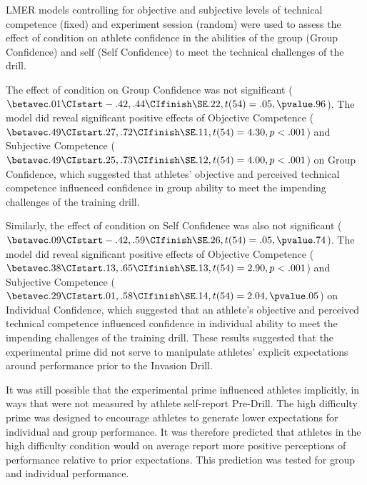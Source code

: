 LMER models controlling for objective and subjective levels of technical competence (fixed) and experiment session (random) were used to assess the effect of condition on athlete confidence in the abilities of the group (Group Confidence) and self (Self Confidence) to meet the technical challenges of the drill.

The effect of condition on Group Confidence was not significant ($\betavec .01 \CIstart -.42, .44 \CIfinish \SE .22, t(54)= .05, \pvalue .96$). The model did reveal significant positive effects of Objective Competence ($\betavec .49 \CIstart .27, .72 \CIfinish \SE .11, t(54)= 4.30, p <.001$) and Subjective Competence ($\betavec .49 \CIstart .25, .73 \CIfinish \SE .12, t(54)= 4.00, p < .001$) on Group Confidence, which suggested that athletes' objective and perceived technical competence influenced confidence in group ability to meet the impending challenges of the training drill.

Similarly, the effect of condition on Self Confidence was also not significant ($\betavec .09 \CIstart -.42, .59 \CIfinish \SE .26, t(54)= .05, \pvalue .74$). The model did reveal significant positive effects of Objective Competence ($\betavec .38 \CIstart .13, .65 \CIfinish \SE .13, t(54)= 2.90, p <.001$) and Subjective Competence ($\betavec .29 \CIstart .01, .58 \CIfinish \SE .14, t(54)= 2.04, \pvalue .05$) on Individual Confidence, which suggested that an athlete's objective and perceived technical competence influenced confidence in individual ability to meet the impending challenges of the training drill.  These results suggested that the experimental prime did not serve to manipulate athletes' explicit expectations around performance prior to the Invasion Drill.

It was still possible that the experimental prime influenced athletes implicitly, in ways that were not measured by athlete self-report Pre-Drill.  The high difficulty prime was designed to encourage athletes to generate lower expectations for individual and group performance. It was therefore predicted that athletes in the high difficulty condition would on average report more positive perceptions of performance relative to prior expectations.  This prediction was tested for group and individual performance.







